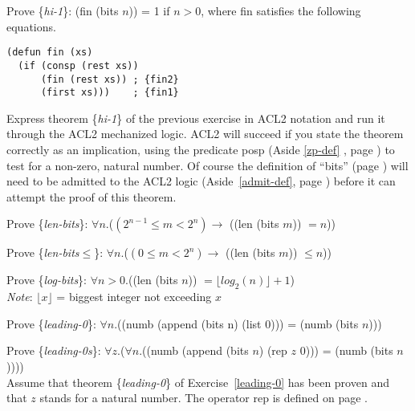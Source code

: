 \begin{ExerciseList}
\Exercise \label{hi-1} Prove \{\emph{hi-1}\}:
(fin (bits $n$)) = 1 if $n > 0$, where fin satisfies the following equations.
\label{fin-defun}
\begin{Verbatim}
(defun fin (xs)
  (if (consp (rest xs))
      (fin (rest xs)) ; {fin2}
      (first xs)))    ; {fin1}
\end{Verbatim}

\Exercise \label{hi-1-defthm} Express
theorem \{\emph{hi-1}\}
of the previous exercise in ACL2 notation
and run it through the ACL2 mechanized logic.
ACL2 will succeed if you state the theorem correctly as an implication,
using the predicate posp (Aside \ref{zp-def} , page \pageref{zp-def})
to test for a non-zero, natural number.
Of course the definition of ``bits'' (page \pageref{bits-defun})
will need to be admitted to the ACL2 logic  (Aside~\ref{admit-def}, page \pageref{admit-def})
before it can attempt the proof of this theorem.

\Exercise \label{len-bits}
Prove \{\emph{len-bits}\}:
$\forall n$.($(2^{n-1} \le m < 2^n) \rightarrow$ ((len (bits $m$)) $= n$))

\Exercise \label{len-bitsLE}
Prove \{\emph{len-bits}$\le$\}:
$\forall n$.($(0 \le m < 2^n) \rightarrow$ ((len (bits $m$)) $\le n$))

\Exercise \label{log-bits}
Prove \{\emph{log-bits}\}:
$\forall n > 0$.((len (bits $n$)) $= \lfloor log_2(n) \rfloor + 1$) \\
\emph{Note}: $\lfloor x \rfloor$ = biggest integer not exceeding $x$

\Exercise \label{leading-0}
Prove \{\emph{leading-0}\}:
$\forall n$.((numb (append (bits n) (list 0))) = (numb (bits $n$)))

\Exercise \label{leading-0s}
Prove \{\emph{leading-0s}\}:
$\forall z$.($\forall n$.((numb (append (bits $n$) (rep $z$ 0))) = (numb (bits $n$)))) \\
Assume that theorem \{\emph{leading-0}\} of Exercise~\ref{leading-0}
has been proven and that $z$ stands for a natural number.
The operator rep is defined on page \pageref{rep-equations}.


\end{ExerciseList}
